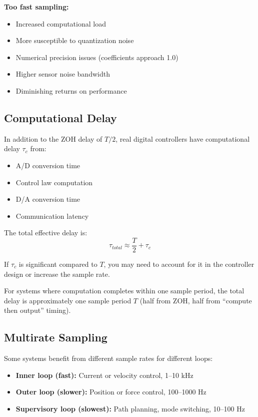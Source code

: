 \textbf{Too fast sampling:}
\begin{itemize}
    \item Increased computational load
    \item More susceptible to quantization noise
    \item Numerical precision issues (coefficients approach 1.0)
    \item Higher sensor noise bandwidth
    \item Diminishing returns on performance
\end{itemize}


\subsection{Computational Delay}

In addition to the ZOH delay of $T/2$, real digital controllers have computational delay $\tau_c$ from:
\begin{itemize}
    \item A/D conversion time
    \item Control law computation
    \item D/A conversion time
    \item Communication latency
\end{itemize}

The total effective delay is:
\begin{equation}
\tau_{total} \approx \frac{T}{2} + \tau_c
\end{equation}

If $\tau_c$ is significant compared to $T$, you may need to account for it in the controller design or increase the sample rate.

For systems where computation completes within one sample period, the total delay is approximately one sample period $T$ (half from ZOH, half from ``compute then output'' timing).

\subsection{Multirate Sampling}

Some systems benefit from different sample rates for different loops:

\begin{itemize}
    \item \textbf{Inner loop (fast):} Current or velocity control, 1--10 kHz
    \item \textbf{Outer loop (slower):} Position or force control, 100--1000 Hz
    \item \textbf{Supervisory loop (slowest):} Path planning, mode switching, 10--100 Hz
\end{itemize}

